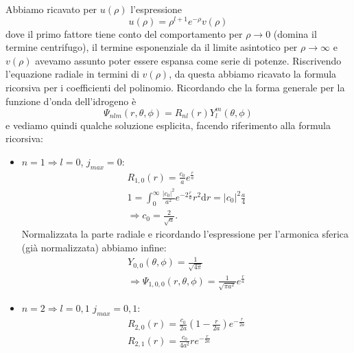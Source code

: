 Abbiamo ricavato per $u\left(\rho\right)$ l'espressione
\[u\left(\rho\right)=\rho^{l+1}e^{-\rho}v\left(\rho\right)\] dove il primo fattore tiene conto del comportamento per $\rho \rightarrow 0$ (domina il termine centrifugo), il termine esponenziale da il limite asintotico per $\rho \rightarrow \infty$ e $v\left(\rho\right)$ avevamo assunto poter essere espansa come serie di potenze. Riscrivendo l'equazione radiale in termini di $v\left(\rho\right)$, da questa abbiamo ricavato la formula ricorsiva per i coefficienti del polinomio. 
Ricordando che la forma generale per la funzione d'onda dell'idrogeno è \begin{equation}
\Psi_{nlm}\left(r,\theta,\phi\right)=R_{nl}\left(r\right)Y^m_l(\theta,\phi)
\end{equation}
e vediamo quindi qualche soluzione esplicita, facendo riferimento alla formula ricorsiva:
\begin{itemize}
\item $n=1\Longrightarrow l=0$, $j_{max}=0$:
\begin{equation}\begin{split}
R_{1,0}\left(r\right)=\frac{c_0}{a}e^{\frac{r}{a}} \\ 
1=\int_{0}^{\infty }{\frac{|c_0|^2}{a^2}e^{-2\frac{r}{a}}r^2 \textrm{d}r}=|c_0|^2\frac{a}{4} \\
\Longrightarrow c_0=\frac{2}{\sqrt{a}}.
\end{split}\end{equation}
Normalizzata la parte radiale e ricordando l'espressione per l'armonica sferica (già normalizzata) abbiamo infine:
\begin{equation}\begin{split}
Y_{0,0}\left(\theta,\phi\right)=\frac{1}{\sqrt{4\pi}} \\
\Longrightarrow \Psi _{1,0,0}\left(r,\theta,\phi\right)=\frac{1}{\sqrt{\pi a^2}}e^{\frac{r}{a}}
\end{split}\end{equation}

\item $n=2 \Longrightarrow l=0,1$ $j_{max}=0,1$:
\begin{equation}\begin{split}
R_{2,0}\left(r\right)=\frac{c_0}{2a}\left(1-\frac{r}{2a}\right)e^{-\frac{r}{2a}} \\
R_{2,1}\left(r\right)=\frac{c_0}{4a^2}re^{-\frac{r}{2a}}
\end{split} \end{equation}
\end{itemize}


